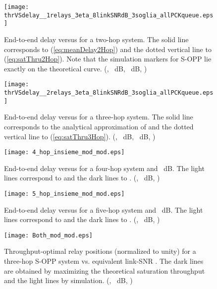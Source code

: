 \documentclass[draftclsnofoot,10pt,onecolumn,letterpaper]{IEEEtran}
\newcommand{\figw}{\columnwidth}
\begin{document}

 


\newpage

\begin{figure}
	\centering
	\texttt{[image: thrVSdelay\_\_1relays\_3eta\_8linkSNRdB\_3soglia\_allPCKqueue.eps]}
	\caption{End-to-end delay versus  for a two-hop system. The solid line corresponds to  (\ref{eq:meanDelay2Hop}) and the dotted vertical line to  (\ref{eq:satThru2Hop}). Note that the simulation markers for S-OPP lie exactly on the theoretical curve. (, ~dB, ~dB, )}
	\label{fig:2hop}
\end{figure}

\begin{figure}
	\centering
	\texttt{[image: thrVSdelay\_\_2relays\_3eta\_8linkSNRdB\_3soglia\_allPCKqueue.eps]}
	\caption{End-to-end delay versus  for a three-hop system. The solid line corresponds to the analytical approximation of  and the dotted vertical line to  (\ref{eq:satThru3Hop}). (, ~dB, ~dB, )}
	\label{fig:3hop}
\end{figure}

\begin{figure}
	\centering
	\texttt{[image: 4\_hop\_insieme\_mod\_mod.eps]}
	\caption{End-to-end delay versus  for a four-hop system and ~dB. The light lines correspond to  and the dark lines to . 
                (, ~dB, )}
	\label{fig:4hop}
\end{figure}

\begin{figure}
	\centering
	\texttt{[image: 5\_hop\_insieme\_mod\_mod.eps]}
	\caption{End-to-end delay versus  for a five-hop system and ~dB. The light lines correspond to  and the dark lines to .
                (, ~dB, )}
	\label{fig:5hop}
\end{figure}

\begin{figure}
	\centering
	\texttt{[image: Both\_mod\_mod.eps]}
	\caption{Throughput-optimal relay positions (normalized to unity) for a three-hop S-OPP system vs. equivalent link-SNR . 
         The dark lines are obtained by maximizing the theoretical saturation throughput and the light lines by simulation.
         (, ~dB, )}
	\label{fig:3hopOptPos}
\end{figure}
\end{document}
